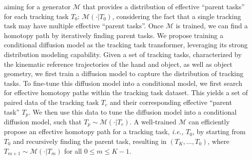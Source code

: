 aiming for a generator $\mathcal{M}$ that provides a distribution of effective ``parent tasks'' for each tracking task $T_0$: $\mathcal{M}(\cdot \vert T_0)$, considering the fact that a single tracking task may have multiple effective ``parent tasks''.
Once $\mathcal{M}$ is trained, we can find a homotopy path by iteratively finding parent tasks.
We propose training a conditional diffusion model as the tracking task transformer, leveraging its strong distribution modeling capability. Given a set of tracking tasks, characterized by the kinematic reference trajectories of the hand and object, as well as object geometry, we first train a diffusion model to capture the distribution of tracking tasks.
To fine-tune this diffusion model into a conditional model, we first search for effective homotopy paths within the tracking task dataset. This yields a set of paired data of the tracking task $T_c$ and their corresponding effective ``parent task'' $T_p$. We then use this data to tune the diffusion model into a conditional diffusion model, such that $T_p \sim \mathcal{M}(\cdot \vert T_c)$. A well-trained $\mathcal{M}$ can efficiently propose an effective homotopy path for a tracking task, \emph{i.e.,} $T_0$, by starting from $T_0$ and recursively finding the parent task, resulting in  $(T_K, ..., T_0)$, where $T_{m+1} \sim \mathcal{M}(\cdot \vert T_m)$ for all $0 \le m \le K-1$.







